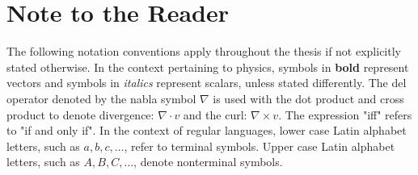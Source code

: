 
% 







\chapter{Note to the Reader}
The following notation conventions apply throughout the thesis if not explicitly stated otherwise.  In the context pertaining to physics, symbols in \textbf{bold} represent vectors and symbols in \textit{italics} represent scalars, unless stated differently.
The del operator denoted by the nabla symbol $\nabla$ is used with the dot product and cross product to denote divergence: $\nabla \cdot v$ and the curl: $\nabla \times v$.
The expression "iff" refers to "if and only if".
In the context of regular languages, lower case Latin alphabet letters, such as $a, b, c, \dots$, refer to terminal symbols. Upper case Latin alphabet letters, such as $A, B, C,\dots$, denote nonterminal symbols.

